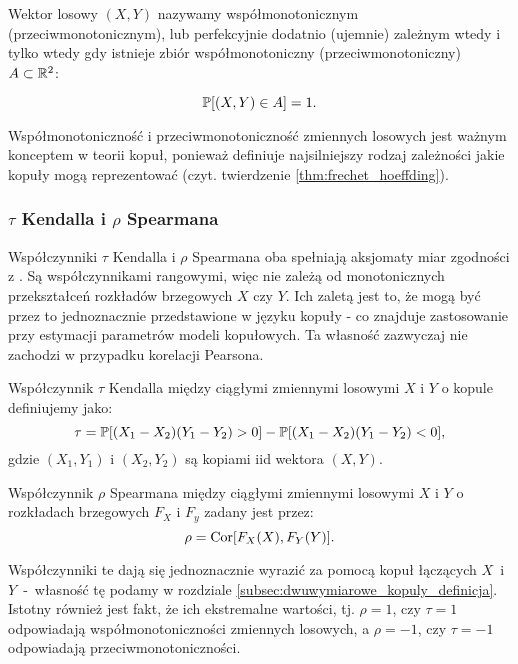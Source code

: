 \begin{df}
	Wektor losowy $(X, Y)$ nazywamy współmonotonicznym (przeciwmonotonicznym), lub perfekcyjnie dodatnio (ujemnie) zależnym wtedy i tylko wtedy gdy istnieje zbiór współmonotoniczny (przeciwmonotoniczny) $A\subset\mathbb{R}^2$:
	
	$$ \mathbb{P}[(X,Y)\in A]=1.$$
\end{df}

Współmonotoniczność i przeciwmonotoniczność zmiennych losowych jest ważnym konceptem w teorii kopuł, ponieważ definiuje najsilniejszy rodzaj zależności jakie kopuły mogą reprezentować (czyt. twierdzenie \ref{thm:frechet_hoeffding}).

\subsubsection{$\tau$ Kendalla i $\rho$ Spearmana}

Współczynniki $\tau$ Kendalla i $\rho$ Spearmana oba spełniają aksjomaty miar zgodności z \cite{Scarsini1984}. Są współczynnikami rangowymi, więc nie zależą od monotonicznych przekształceń rozkładów brzegowych $X$ czy $Y$. Ich zaletą jest to, że mogą być przez to jednoznacznie przedstawione w języku kopuły - co znajduje zastosowanie przy estymacji parametrów modeli kopułowych. Ta własność zazwyczaj nie zachodzi w przypadku korelacji Pearsona.

\begin{df}
	Współczynnik $\tau$ Kendalla między ciągłymi zmiennymi losowymi $X$ i $Y$ o kopule definiujemy jako:
	$$ \tau = \mathbb{P}[(X_1-X_2)(Y_1-Y_2)>0] - \mathbb{P}[(X_1-X_2)(Y_1-Y_2) <0], $$
	gdzie $(X_1, Y_1)$ i $(X_2, Y_2)$ są kopiami iid wektora $(X, Y)$.
\end{df}

\begin{df}
	Współczynnik $\rho$ Spearmana między ciągłymi zmiennymi losowymi $X$ i $Y$ o rozkładach brzegowych $F_X$ i $F_y$ zadany jest przez:
	$$ \rho = \text{Cor}[F_X(X), F_Y(Y)].$$
\end{df}

Współczynniki te dają się jednoznacznie wyrazić za pomocą kopuł łączących $X$~i~$Y$~-~własność tę podamy w rozdziale \ref{subsec:dwuwymiarowe_kopuly_definicja}. Istotny również jest fakt, że ich ekstremalne wartości, tj. $\rho= 1$, czy $\tau=1$ odpowiadają współmonotoniczności zmiennych losowych, a $\rho=-1$, czy $\tau=-1$ odpowiadają przeciwmonotoniczności.

